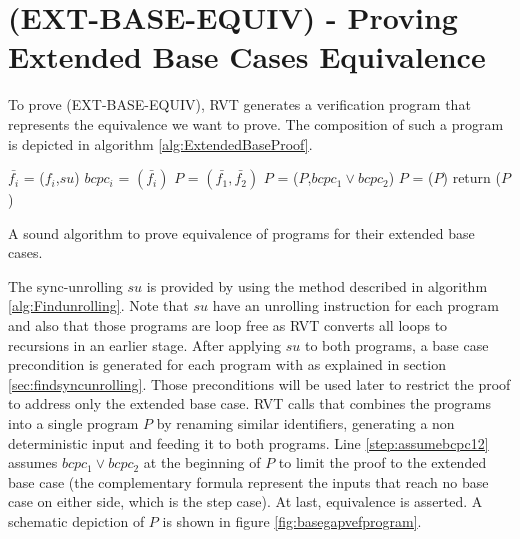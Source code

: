\section{(EXT-BASE-EQUIV) - Proving Extended Base Cases Equivalence}
\label{sec:EXT-BASE-EQUIV}
To prove (EXT-BASE-EQUIV), RVT generates a verification program that represents the equivalence we want to prove. The composition of such a program is depicted in algorithm  \ref{alg:ExtendedBaseProof}.

\noindent
\begin{algorithm}
\begin{minipage}{\linewidth}
\begin{algorithmic}[1]
    \label{step:foreach_p}
	\State$\bar{f_i}$ = ($f_i$,$su$)
	\State $bcpc_i$ = $(\bar{f_i})$
	\EndFor
	\State $P$ = $(\bar{f_1},\bar{f_2})$
    \State $P$ = ($P$,$bcpc_1 \lor bcpc_2$) \label{step:assumebcpc12}
    \State $P$ = ($P$)
    \State return ($P$)
	\EndFunction
\end{algorithmic}
\end{minipage}
\caption{A sound algorithm to prove equivalence of programs for their extended base cases.}
\label{alg:ExtendedBaseProof}
\end{algorithm}
The sync-unrolling $su$ is provided by using the method described in algorithm \ref{alg:Findunrolling}. Note that $su$ have an unrolling instruction for each program and also that those programs are loop free as RVT converts all loops to recursions in an earlier stage. After applying $su$ to both programs, a base case precondition is generated for each program with  as explained in section \ref{sec:findsyncunrolling}. Those preconditions will be used later to restrict the proof to address only the extended base case. RVT calls  that combines the programs into a single program $P$ by renaming similar identifiers, generating a non deterministic input and feeding it to both programs. Line \ref{step:assumebcpc12} assumes $bcpc_1 \lor bcpc_2$ at the beginning of $P$ to limit the proof to the extended base case (the complementary formula represent the inputs that reach no base case on either side, which is the step case). At last, equivalence is asserted. A schematic depiction of $P$ is shown in figure \ref{fig:basegapvefprogram}. 
